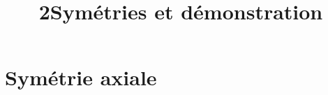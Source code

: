 \documentclass[12pt,a4paper]{article}
\date{}
\title{\textcircled{{\normalsize{2}}}Symétries et démonstration}
\begin{document}
\maketitle








\section{Symétrie axiale}




%
%
%
%
%
%
%
%
%
%
%
%
%
\end{document}
